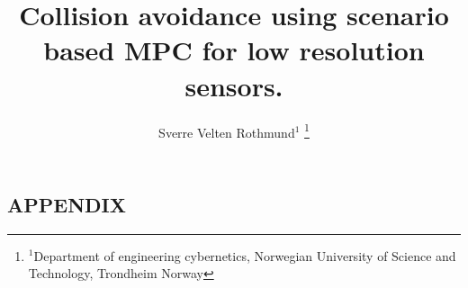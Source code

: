 \documentclass[letterpaper, 10 pt, conference]{ieeeconf}  %
\title{\LARGE \bf
Collision avoidance using scenario based MPC for low resolution sensors. 
}
\author{Sverre Velten Rothmund$^{1}$ %
\thanks{$^{1}$Department of engineering cybernetics, Norwegian University of Science and Technology, Trondheim Norway}%
}
\begin{document}
\maketitle
\thispagestyle{plain}
\pagestyle{plain}









%










\onecolumn
\begin{appendices}
\section*{APPENDIX}


\end{appendices}
\end{document}
